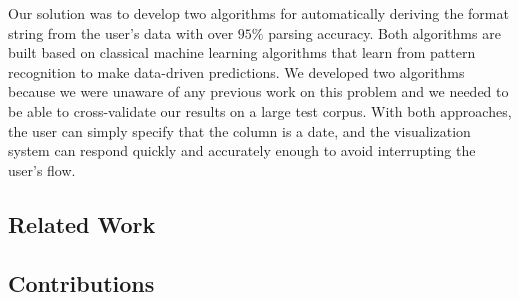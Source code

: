 Our solution was to develop two algorithms for automatically deriving the format string from the user's data with over $95\%$ parsing accuracy. Both algorithms are built based on classical machine learning algorithms that learn from pattern recognition to make data-driven predictions. We developed two algorithms because we were unaware of any previous work on this problem and we needed to be able to cross-validate our results on a large test corpus. With both approaches, the user can simply specify that the column is a date, and the visualization system can respond quickly and accurately enough to avoid interrupting the user's flow.

\subsection{Related Work}


\subsection{Contributions}

